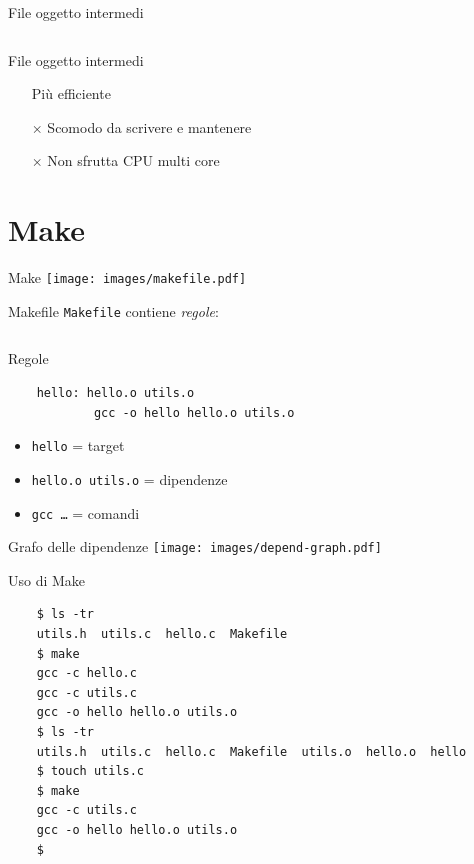 \documentclass[xetex,table]{beamer}
\begin{document}
\begin{frame}[fragile]{File oggetto intermedi}
  \small\inputminted[bgcolor=codebackground,frame=single]{shell}{examples/1-shell-2/build.sh}
\end{frame}

\begin{frame}{File oggetto intermedi}
  \begin{itemize}
  \item[\checkmark] Più efficiente
  \item[$\times$]   Scomodo da scrivere e mantenere
  \item[$\times$]   Non sfrutta CPU multi core
  \end{itemize}
\end{frame}

\section{Make}

\begin{frame}{Make}
  \center\texttt{[image: images/makefile.pdf]}
\end{frame}

\begin{frame}{Makefile}
  \texttt{Makefile} contiene {\em regole}:

  \inputminted[bgcolor=codebackground,frame=single]{makefile}{examples/2-make-1/Makefile}
\end{frame}

\begin{frame}[fragile]{Regole}
  \begin{verbatim}
    hello: hello.o utils.o
            gcc -o hello hello.o utils.o
  \end{verbatim}

  \begin{itemize}
  \item \texttt{hello} = target
  \item \texttt{hello.o utils.o} = dipendenze
  \item \texttt{gcc \dots} = comandi
  \end{itemize}
\end{frame}

\begin{frame}{Grafo delle dipendenze}
  \center\texttt{[image: images/depend-graph.pdf]}
\end{frame}

\begin{frame}[fragile]{Uso di Make}
  \begin{verbatim}
    $ ls -tr
    utils.h  utils.c  hello.c  Makefile
    $ make
    gcc -c hello.c
    gcc -c utils.c
    gcc -o hello hello.o utils.o
    $ ls -tr
    utils.h  utils.c  hello.c  Makefile  utils.o  hello.o  hello
    $ touch utils.c
    $ make
    gcc -c utils.c
    gcc -o hello hello.o utils.o
    $
  \end{verbatim}
\end{frame}
\end{document}
